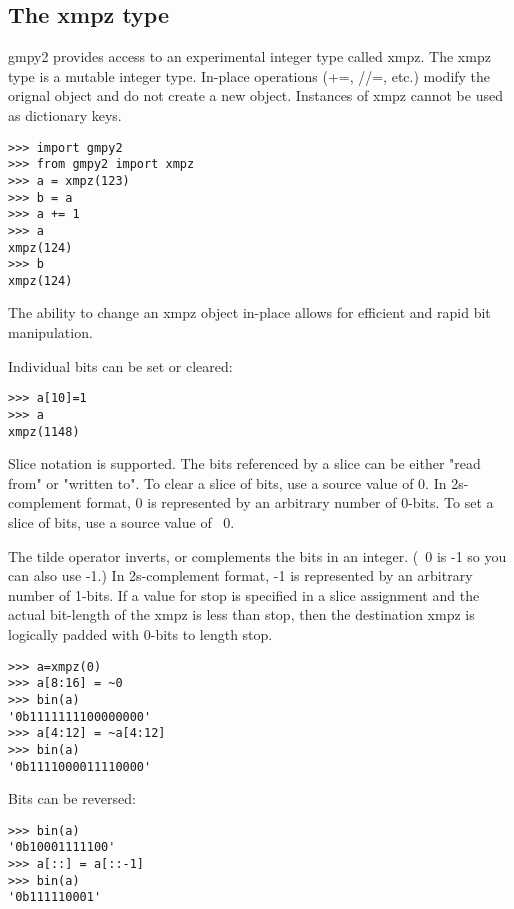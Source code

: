 \subsection{The xmpz type}

gmpy2 provides access to an experimental integer type called xmpz. The xmpz type is a
mutable integer type. In-place operations (+=, //=, etc.) modify the orignal object and do not create a new object. Instances of xmpz cannot be used as dictionary keys.

\begin{lstlisting}
>>> import gmpy2
>>> from gmpy2 import xmpz
>>> a = xmpz(123)
>>> b = a
>>> a += 1
>>> a
xmpz(124)
>>> b
xmpz(124)
\end{lstlisting}

The ability to change an xmpz object in-place allows for efficient and rapid bit manipulation.

Individual bits can be set or cleared:

\begin{lstlisting}
>>> a[10]=1
>>> a
xmpz(1148)
\end{lstlisting}

Slice notation is supported. The bits referenced by a slice can be either "read from" or
"written to". To clear a slice of bits, use a source value of 0. In 2s-complement format, 0 is represented by an arbitrary number of 0-bits. To set a slice of bits, use a source value of ~0.

The tilde operator inverts, or complements the bits in an integer. (~0 is -1 so you can also
use -1.) In 2s-complement format, -1 is represented by an arbitrary number of 1-bits.
If a value for stop is specified in a slice assignment and the actual bit-length of the xmpz is less than stop, then the destination xmpz is logically padded with 0-bits to length stop.

\begin{lstlisting}
>>> a=xmpz(0)
>>> a[8:16] = ~0
>>> bin(a)
'0b1111111100000000'
>>> a[4:12] = ~a[4:12]
>>> bin(a)
'0b1111000011110000'
\end{lstlisting}

Bits can be reversed:

\begin{lstlisting}
>>> bin(a)
'0b10001111100'
>>> a[::] = a[::-1]
>>> bin(a)
'0b111110001'
\end{lstlisting}

